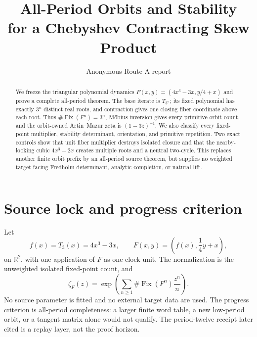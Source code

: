 \documentclass[10pt]{article}
\title{All-Period Orbits and Stability\\
for a Chebyshev Contracting Skew Product}
\author{Anonymous Route-A report}
\date{}
\newcommand{\Fix}{\operatorname{Fix}}
\begin{document}
\maketitle

\begin{abstract}
We freeze the triangular polynomial dynamics
$F(x,y)=(4x^3-3x,y/4+x)$ and prove a complete all-period theorem.
The base iterate is $T_{3^n}$; its fixed polynomial has exactly $3^n$
distinct real roots, and contraction gives one closing fiber coordinate above
each root.  Thus $\#\Fix(F^n)=3^n$, M\"obius inversion gives every primitive
orbit count, and the orbit-owned Artin--Mazur zeta is $(1-3z)^{-1}$.  We also
classify every fixed-point multiplier, stability determinant, orientation, and
primitive repetition.  Two exact controls show that unit fiber multiplier
destroys isolated closure and that the nearby-looking cubic $4x^3-2x$ creates
multiple roots and a neutral two-cycle.  This replaces another finite orbit
prefix by an all-period source theorem, but supplies no weighted target-facing
Fredholm determinant, analytic completion, or natural lift.
\end{abstract}

\section{Source lock and progress criterion}
Let
\[
 f(x)=T_3(x)=4x^3-3x,\qquad
 F(x,y)=\left(f(x),\frac14y+x\right),
\]
on $\mathbb R^2$, with one application of $F$ as one clock unit.  The
normalization is the unweighted isolated fixed-point count, and
\[
 \zeta_F(z)=\exp\!\left(\sum_{n\ge1}\#\Fix(F^n)\frac{z^n}{n}\right).
\]
No source parameter is fitted and no external target data are used.  The
progress criterion is all-period completeness: a larger finite word table, a
new low-period orbit, or a tangent matrix alone would not qualify.  The
period-twelve receipt later cited is a replay layer, not the proof horizon.
\end{document}
